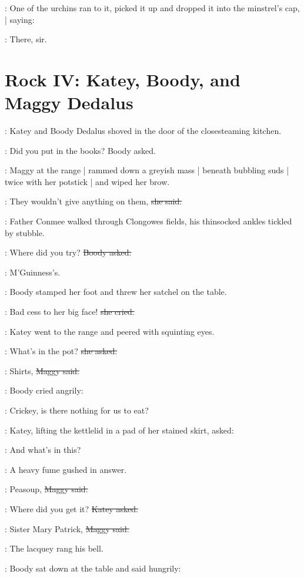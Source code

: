 :
One of the urchins ran to it,
picked it up and dropped it into the minstrel's cap, |
saying:

:
There, sir.


\section*{Rock IV: Katey, Boody, and Maggy Dedalus}

:
Katey and Boody Dedalus shoved in the door
of the closesteaming kitchen.

\boody:
Did you put in the books?
Boody asked.

:
Maggy at the range |
rammed down a greyish mass |
beneath bubbling suds |
twice with her potstick |
and wiped her brow.

\maggy:
They wouldn't give anything on them,
\sout{she said.}

:
Father Conmee walked through Clongowes fields,
his thinsocked ankles tickled by stubble.

\boody:
Where did you try?
\sout{Boody asked.}

\maggy:
M'Guinness's.

:
Boody stamped her foot and threw her satchel on the table.

\boody:
Bad cess to her big face!
\sout{she cried.}

:
Katey went to the range
and peered with squinting eyes.

\katey:
What's in the pot?
\sout{she asked.}

\maggy:
Shirts,
\sout{Maggy said.}

:
Boody cried angrily:

\boody:
Crickey, is there nothing for us to eat?

:
Katey,
lifting the kettlelid in a pad of her stained skirt,
asked:

\katey:
And what's in this?

:
A heavy fume gushed in answer.

\maggy:
Peasoup,
\sout{Maggy said.}

\katey:
Where did you get it?
\sout{Katey asked.}

\maggy:
Sister Mary Patrick,
\sout{Maggy said.}

:
The lacquey rang his bell.


:
Boody sat down at the table and said hungrily:

